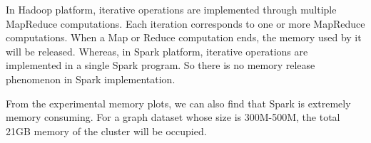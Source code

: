 \documentclass[12pt,conference,letterpaper]{IEEEtran}
\begin{document}
In Hadoop platform, iterative operations are implemented through multiple MapReduce computations. Each iteration corresponds to one or more MapReduce computations. When a Map or Reduce computation ends, the memory used by it will be released. Whereas, in Spark platform, iterative operations are implemented in a single Spark program. So there is no memory release phenomenon in Spark implementation. 

From the experimental memory plots, we can also find that Spark is extremely memory consuming. For a graph dataset whose size is 300M-500M, the total 21GB memory of the cluster will be occupied. 




\end{document}
